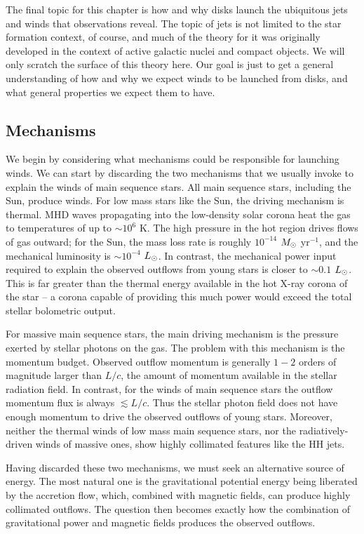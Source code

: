 The final topic for this chapter is how and why disks launch the ubiquitous jets and winds that observations reveal. The topic of jets is not limited to the star formation context, of course, and much of the theory for it was originally developed in the context of active galactic nuclei and compact objects. We will only scratch the surface of this theory here. Our goal is just to get a general understanding of how and why we expect winds to be launched from disks, and what general properties we expect them to have.

\subsection{Mechanisms}

We begin by considering what mechanisms could be responsible for launching winds. We can start by discarding the two mechanisms that we usually invoke to explain the winds of main sequence stars. All main sequence stars, including the Sun, produce winds. For low mass stars like the Sun, the driving mechanism is thermal. MHD waves propagating into the low-density solar corona heat the gas to temperatures of up to $\sim 10^6$ K. The high pressure in the hot region drives flows of gas outward; for the Sun, the mass loss rate is roughly $10^{-14}$ $M_{\odot}$ yr$^{-1}$, and the mechanical luminosity is $\sim 10^{-4}$ $L_{\odot}$. In contrast, the mechanical power input required to explain the observed outflows from young stars is closer to $\sim 0.1$ $L_{\odot}$. This is far greater than the thermal energy available in the hot X-ray corona of the star -- a corona capable of providing this much power would exceed the total stellar bolometric output.

For massive main sequence stars, the main driving mechanism is the pressure exerted by stellar photons on the gas. The problem with this mechanism is the momentum budget. Observed outflow momentum is generally $1-2$ orders of magnitude larger than $L/c$, the amount of momentum available in the stellar radiation field. In contrast, for the winds of main sequence stars the outflow momentum flux is always $\lesssim L/c$. Thus the stellar photon field does not have enough momentum to drive the observed outflows of young stars. Moreover, neither the thermal winds of low mass main sequence stars, nor the radiatively-driven winds of massive ones, show highly collimated features like the HH jets.

Having discarded these two mechanisms, we must seek an alternative source of energy. The most natural one is the gravitational potential energy being liberated by the accretion flow, which, combined with magnetic fields, can produce highly collimated outflows. The question then becomes exactly how the combination of gravitational power and magnetic fields produces the observed outflows.

